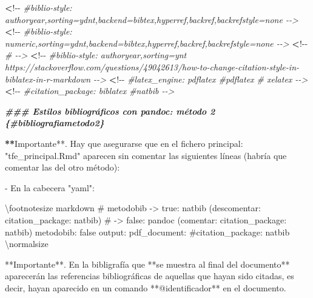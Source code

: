 \documentclass[11pt,a4paper,oneside,]{article}
\newenvironment{Shaded}{\begin{snugshade}}{\end{snugshade}}
\newcommand{\AttributeTok}[1]{\textcolor[rgb]{0.77,0.63,0.00}{#1}}
\newcommand{\CommentTok}[1]{\textcolor[rgb]{0.56,0.35,0.01}{\textit{#1}}}
\newcommand{\DocumentationTok}[1]{\textcolor[rgb]{0.56,0.35,0.01}{\textbf{\textit{#1}}}}
\newcommand{\ErrorTok}[1]{\textcolor[rgb]{0.64,0.00,0.00}{\textbf{#1}}}
\newcommand{\NormalTok}[1]{#1}
\newcommand{\SpecialCharTok}[1]{\textcolor[rgb]{0.00,0.00,0.00}{#1}}
\newcommand{\StringTok}[1]{\textcolor[rgb]{0.31,0.60,0.02}{#1}}
\numberwithin{dummy}{section}
\theoremstyle{ocrenumbox}
\theoremstyle{blacknumex}
\theoremstyle{blacknumbox}
\theoremstyle{ocrenum}
\theoremstyle{ocrenum}
\begin{document}
\begin{Shaded}
\begin{Highlighting}[numbers=left,,firstnumber=1101,]
\ErrorTok{\textless{}}\SpecialCharTok{!{-}{-}} \CommentTok{\#biblio{-}style: authoryear,sorting=ydnt,backend=bibtex,hyperref,backref,backrefstyle=none {-}{-}\textgreater{}}
\ErrorTok{\textless{}}\SpecialCharTok{!{-}{-}} \CommentTok{\#biblio{-}style: numeric,sorting=ydnt,backend=bibtex,hyperref,backref,backrefstyle=none {-}{-}\textgreater{}}
\ErrorTok{\textless{}}\SpecialCharTok{!{-}{-}} \CommentTok{\# {-}{-}\textgreater{}}
\ErrorTok{\textless{}}\SpecialCharTok{!{-}{-}} \CommentTok{\#biblio{-}style: authoryear,sorting=ynt  https://stackoverflow.com/questions/49042613/how{-}to{-}change{-}citation{-}style{-}in{-}biblatex{-}in{-}r{-}markdown {-}{-}\textgreater{}}
\ErrorTok{\textless{}}\SpecialCharTok{!{-}{-}} \CommentTok{\#latex\_engine: pdflatex  \#pdflatex  \# xelatex {-}{-}\textgreater{}}
\ErrorTok{\textless{}}\SpecialCharTok{!{-}{-}} \CommentTok{\#citation\_package: biblatex \#natbib {-}{-}\textgreater{}}



\DocumentationTok{\#\#\# Estilos bibliográficos con pandoc: método 2 \{\#bibliografiametodo2\}}


\ErrorTok{**}\NormalTok{Importante}\SpecialCharTok{**}\NormalTok{. Hay que asegurarse que en el fichero principal}\SpecialCharTok{:} \StringTok{"tfe\_principal.Rmd"}\NormalTok{ aparecen sin comentar las siguientes líneas (habría que comentar las del otro método)}\SpecialCharTok{:}

\SpecialCharTok{{-}}\NormalTok{ En la cabecera }\StringTok{"yaml"}\SpecialCharTok{:}

\NormalTok{\textbackslash{}footnotesize}
\StringTok{\textasciigrave{}\textasciigrave{}\textasciigrave{}}\AttributeTok{markdown}
\AttributeTok{\# metodobib {-}\textgreater{} true: natbib (descomentar: citation\_package: natbib) }
\AttributeTok{\#           {-}\textgreater{} false: pandoc (comentar: citation\_package: natbib)}
\AttributeTok{metodobib: false}
\AttributeTok{output: }
\AttributeTok{  pdf\_document: }
\AttributeTok{    \#citation\_package: natbib}
\StringTok{\textasciigrave{}\textasciigrave{}\textasciigrave{}}
\NormalTok{\textbackslash{}normalsize}




\SpecialCharTok{**}\NormalTok{Importante}\SpecialCharTok{**}\NormalTok{. En la bibligrafía  que }\SpecialCharTok{**}\NormalTok{se muestra al final del documento}\SpecialCharTok{**}\NormalTok{  aparecerán las referencias bibliográficas de aquellas que hayan sido citadas, es decir, hayan aparecido en un comando }\SpecialCharTok{**}\StringTok{\textasciigrave{}}\AttributeTok{@identificador}\StringTok{\textasciigrave{}}\SpecialCharTok{**}\NormalTok{ en el documento.}




\end{Highlighting}
\end{Shaded}
\end{document}
